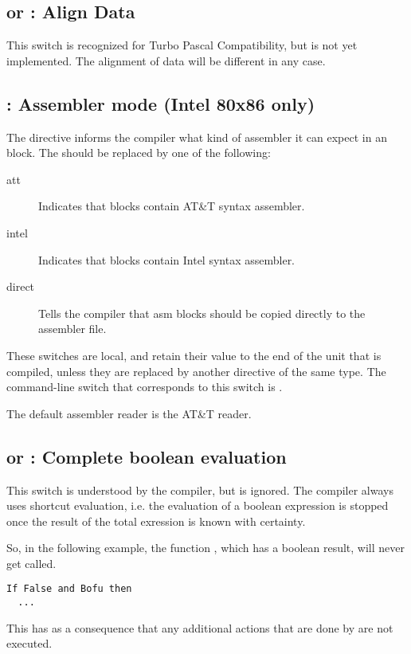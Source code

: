\subsection{ or  : Align Data}

This switch is recognized for Turbo Pascal Compatibility, but is not
yet implemented. The alignment of data will be different in any case.

\subsection{ : Assembler mode (Intel 80x86 only)}
\label{se:AsmReader}

The  directive informs the compiler what kind of assembler
it can expect in an  block. The  should be replaced by one
of the following:
\begin{description}
\item [att\ ] Indicates that  blocks contain AT\&T syntax assembler.
\item [intel\ ] Indicates that  blocks contain Intel syntax
assembler.
\item [direct\ ] Tells the compiler that asm blocks should be copied
directly to the assembler file.
\end{description}
These switches are local, and retain their value to the end of the unit that
is compiled, unless they are replaced by another directive of the same type.
The command-line switch that corresponds to this switch is .

The default assembler reader is the AT\&T reader.

\subsection{ or  : Complete boolean evaluation}

This switch is understood by the \fpc compiler, but is ignored. The compiler
always uses shortcut evaluation, i.e. the evaluation of a boolean expression
is stopped once the result of the total exression is known with certainty.

So, in the following example, the function , which has a boolean
result, will never get called.
\begin{verbatim}
If False and Bofu then
  ...
\end{verbatim}
This has as a consequence that any additional actions that are done by
 are not executed.


